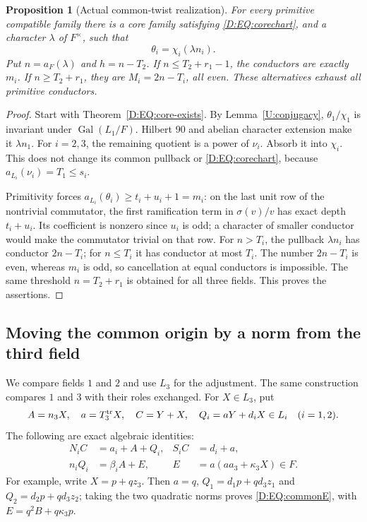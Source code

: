 \documentclass[11pt]{amsart}
\newtheorem{proposition}[theorem]{Proposition}
\theoremstyle{definition}
\theoremstyle{remark}
\newcommand{\Gal}{\operatorname{Gal}}
\begin{document}
\begin{proposition}[Actual common-twist realization]\label{D:EQ:realize}
For every primitive compatible family there is a core family satisfying
\eqref{D:EQ:corechart}, and a character $\lambda$ of $F^\times$, such that
\begin{equation}\label{D:EQ:actual-family}
 \theta_i=\chi_i(\lambda n_i).
\end{equation}
Put $n=a_F(\lambda)$ and $h=n-T_2$.
If $n\le T_2+r_1-1$, the conductors are exactly $m_i$.
If $n\ge T_2+r_1$, they are $M_i=2n-T_i$, all even.
These alternatives exhaust all primitive conductors.
\end{proposition}
\begin{proof}
Start with Theorem~\ref{D:EQ:core-exists}. By Lemma~\ref{U:conjugacy},
$\theta_1/\chi_1$ is invariant under $\Gal(L_1/F)$.
Hilbert 90 and abelian character extension make it $\lambda n_1$.
For $i=2,3$, the remaining quotient is a power of $\nu_i$.
Absorb it into $\chi_i$. This does not change its common pullback or
\eqref{D:EQ:corechart}, because $a_{L_i}(\nu_i)=T_1\le s_i$.

Primitivity forces $a_{L_i}(\theta_i)\ge t_i+u_i+1=m_i$:
on the last unit row of the nontrivial commutator, the first
ramification term in $\sigma(v)/v$ has exact depth $t_i+u_i$.
Its coefficient is nonzero since $u_i$ is odd; a character of smaller
conductor would make the commutator trivial on that row.
For $n>T_i$, the pullback $\lambda n_i$ has conductor $2n-T_i$;
for $n\le T_i$ it has conductor at most $T_i$.
The number $2n-T_i$ is even, whereas $m_i$ is odd, so cancellation
at equal conductors is impossible. The same threshold
$n=T_2+r_1$ is obtained for all three fields. This proves the assertions.
\end{proof}

\subsection{Moving the common origin by a norm from the third field}
We compare fields $1$ and $2$ and use $L_3$ for the adjustment. The same
construction compares $1$ and $3$ with their roles exchanged.
For $X\in L_3$, put
\begin{equation}\label{D:EQ:adjust}
 A=n_3X,\quad a=T_3^{\rm tr}X,\quad C=Y+X,\quad
 Q_i=aY+d_iX\in L_i\quad(i=1,2).
\end{equation}
The following are exact algebraic identities:
\begin{align}
 N_iC&=a_i+A+Q_i,&S_iC&=d_i+a,                    \label{D:EQ:commonC}\\
 n_iQ_i&=\beta_iA+E,&
 E&=a(a a_3+\kappa_3X)\in F.                    \label{D:EQ:commonE}
\end{align}
For example, write $X=p+qz_3$. Then $a=q$,
$Q_1=d_1p+qd_3z_1$ and $Q_2=d_2p+qd_3z_2$; taking the two quadratic
norms proves \eqref{D:EQ:commonE}, with $E=q^2B+q\kappa_3p$.
\end{document}
